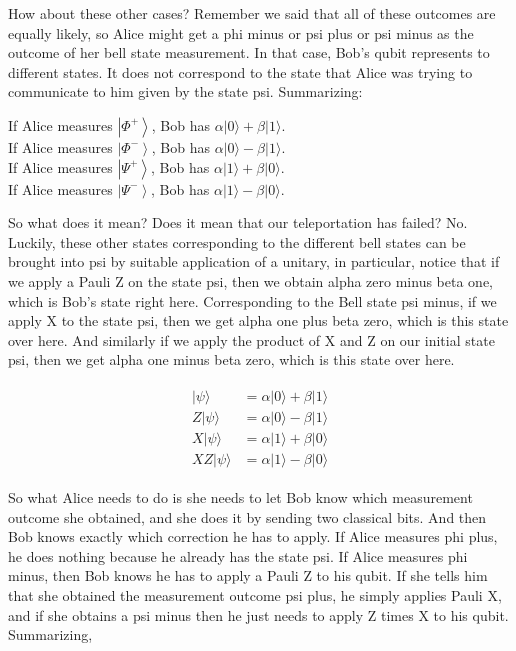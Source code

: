 How about these other cases? Remember we said that all of these outcomes are equally likely, so Alice might get a phi minus or psi plus or psi minus as the outcome of her bell state measurement. In that case, Bob's qubit represents to different states. It does not correspond to the state that Alice was trying to communicate to him given by the state psi.  Summarizing:

If Alice measures $\left|\Phi^{+}\right\rangle$, Bob has $\alpha|0\rangle+\beta|1\rangle$.\\
If Alice measures $\left|\Phi^{-}\right\rangle$, Bob has $\alpha|0\rangle-\beta|1\rangle$.\\
If Alice measures $\left|\Psi^{+}\right\rangle$, Bob has $\alpha|1\rangle+\beta|0\rangle$.\\
If Alice measures $\left|\Psi^{-}\right\rangle$, Bob has $\alpha|1\rangle-\beta|0\rangle$.

So what does it mean? Does it mean that our teleportation has failed? No. Luckily, these other states corresponding to the different bell states can be brought into psi by suitable application of a unitary, in particular, notice that if we apply a Pauli Z on the state psi, then we obtain alpha zero minus beta one, which is Bob's state right here. Corresponding to the Bell state psi minus, if we apply X to the state psi, then we get alpha one plus beta zero, which is this state over here. And similarly if we apply the product of X and Z on our initial state psi, then we get alpha one minus beta zero, which is this state over here. 

\begin{align}
    \begin{aligned}
|\psi\rangle &=\alpha|0\rangle+\beta|1\rangle \\
Z|\psi\rangle &=\alpha|0\rangle-\beta|1\rangle \\
X|\psi\rangle &=\alpha|1\rangle+\beta|0\rangle \\
X Z|\psi\rangle &=\alpha|1\rangle-\beta|0\rangle
\end{aligned}
\end{align}

So what Alice needs to do is she needs to let Bob know which measurement outcome she obtained, and she does it by sending two classical bits. And then Bob knows exactly which correction he has to apply. If Alice measures phi plus, he does nothing because he already has the state psi. If Alice measures phi minus, then Bob knows he has to apply a Pauli Z to his qubit. If she tells him that she obtained the measurement outcome psi plus, he simply applies Pauli X, and if she obtains a psi minus then he just needs to apply Z times X to his qubit.  Summarizing,

